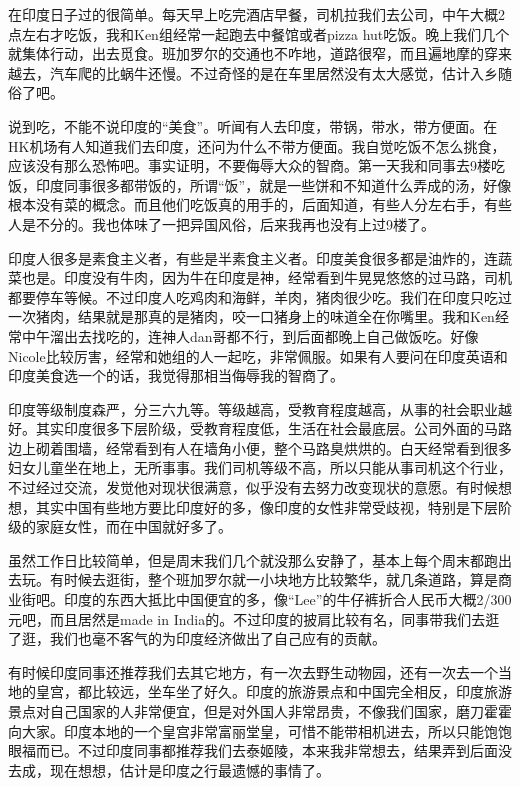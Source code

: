 在印度日子过的很简单。每天早上吃完酒店早餐，司机拉我们去公司，中午大概2点左右才吃饭，我和Ken组经常一起跑去中餐馆或者pizza hut吃饭。晚上我们几个就集体行动，出去觅食。班加罗尔的交通也不咋地，道路很窄，而且遍地摩的穿来越去，汽车爬的比蜗牛还慢。不过奇怪的是在车里居然没有太大感觉，估计入乡随俗了吧。

说到吃，不能不说印度的“美食”。听闻有人去印度，带锅，带水，带方便面。在HK机场有人知道我们去印度，还问为什么不带方便面。我自觉吃饭不怎么挑食，应该没有那么恐怖吧。事实证明，不要侮辱大众的智商。第一天我和同事去9楼吃饭，印度同事很多都带饭的，所谓“饭”，就是一些饼和不知道什么弄成的汤，好像根本没有菜的概念。而且他们吃饭真的用手的，后面知道，有些人分左右手，有些人是不分的。我也体味了一把异国风俗，后来我再也没有上过9楼了。

印度人很多是素食主义者，有些是半素食主义者。印度美食很多都是油炸的，连蔬菜也是。印度没有牛肉，因为牛在印度是神，经常看到牛晃晃悠悠的过马路，司机都要停车等候。不过印度人吃鸡肉和海鲜，羊肉，猪肉很少吃。我们在印度只吃过一次猪肉，结果就是那真的是猪肉，咬一口猪身上的味道全在你嘴里。我和Ken经常中午溜出去找吃的，连神人dan哥都不行，到后面都晚上自己做饭吃。好像Nicole比较厉害，经常和她组的人一起吃，非常佩服。如果有人要问在印度英语和印度美食选一个的话，我觉得那相当侮辱我的智商了。

印度等级制度森严，分三六九等。等级越高，受教育程度越高，从事的社会职业越好。其实印度很多下层阶级，受教育程度低，生活在社会最底层。公司外面的马路边上砌着围墙，经常看到有人在墙角小便，整个马路臭烘烘的。白天经常看到很多妇女儿童坐在地上，无所事事。我们司机等级不高，所以只能从事司机这个行业，不过经过交流，发觉他对现状很满意，似乎没有去努力改变现状的意愿。有时候想想，其实中国有些地方要比印度好的多，像印度的女性非常受歧视，特别是下层阶级的家庭女性，而在中国就好多了。

虽然工作日比较简单，但是周末我们几个就没那么安静了，基本上每个周末都跑出去玩。有时候去逛街，整个班加罗尔就一小块地方比较繁华，就几条道路，算是商业街吧。印度的东西大抵比中国便宜的多，像“Lee”的牛仔裤折合人民币大概2/300元吧，而且居然是made in India的。不过印度的披肩比较有名，同事带我们去逛了逛，我们也毫不客气的为印度经济做出了自己应有的贡献。

有时候印度同事还推荐我们去其它地方，有一次去野生动物园，还有一次去一个当地的皇宫，都比较远，坐车坐了好久。印度的旅游景点和中国完全相反，印度旅游景点对自己国家的人非常便宜，但是对外国人非常昂贵，不像我们国家，磨刀霍霍向大家。印度本地的一个皇宫非常富丽堂皇，可惜不能带相机进去，所以只能饱饱眼福而已。不过印度同事都推荐我们去泰姬陵，本来我非常想去，结果弄到后面没去成，现在想想，估计是印度之行最遗憾的事情了。


